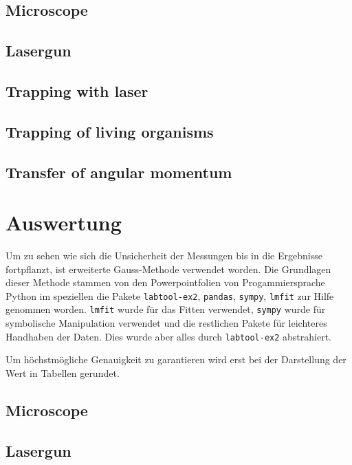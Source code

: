 \documentclass[12pt,english,ngerman]{scrartcl}
\begin{document}
\subsection{Microscope}

\subsection{Lasergun}


\subsection{Trapping with laser}


\subsection{Trapping of living organisms}


\subsection{Transfer of angular momentum}



\section{Auswertung}\label{sec:auswertung}

Um zu sehen wie sich die Unsicherheit der Messungen bis in die Ergebnisse
fortpflanzt, ist erweiterte Gauss-Methode verwendet worden. Die Grundlagen
dieser Methode stammen von den Powerpointfolien von
Progammiersprache Python im speziellen die Pakete \verb#labtool-ex2#,
\verb#pandas#, \verb#sympy#, \verb#lmfit# zur Hilfe genommen worden.
\verb#lmfit# wurde für das Fitten verwendet, \verb#sympy# wurde für symbolische
Manipulation verwendet und die restlichen Pakete für leichteres Handhaben der
Daten. Dies wurde aber alles durch \verb#labtool-ex2# abstrahiert.

Um höchstmögliche Genauigkeit zu garantieren wird erst bei der Darstellung der
Wert in Tabellen gerundet.


\subsection{Microscope}

\subsection{Lasergun}
\end{document}
